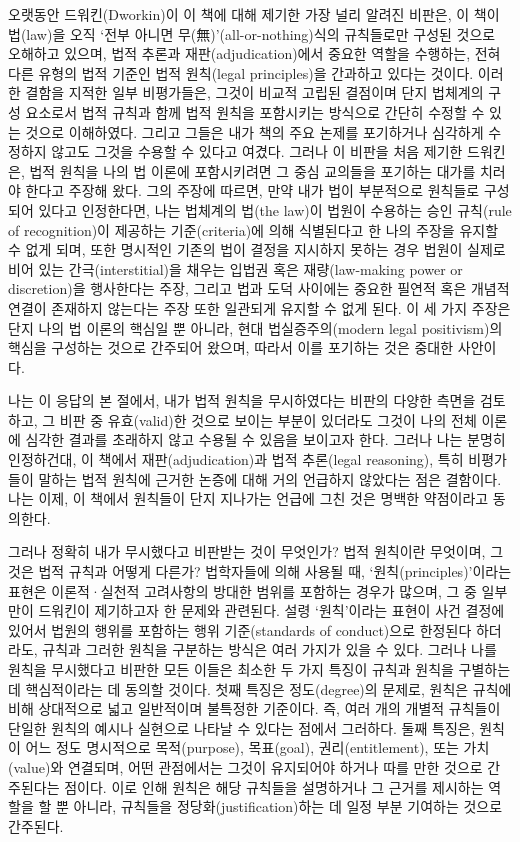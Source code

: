 오랫동안 드워킨(Dworkin)이 이 책에 대해 제기한 가장 널리 알려진 비판은,
이 책이 법(law)을 오직 `전부 아니면 무(無)'(all-or-nothing)식의
규칙들로만 구성된 것으로 오해하고 있으며, 법적 추론과
재판(adjudication)에서 중요한 역할을 수행하는, 전혀 다른 유형의 법적
기준인 법적 원칙(legal principles)을 간과하고 있다는 것이다. 이러한
결함을 지적한 일부 비평가들은, 그것이 비교적 고립된 결점이며 단지
법체계의 구성 요소로서 법적 규칙과 함께 법적 원칙을 포함시키는 방식으로
간단히 수정할 수 있는 것으로 이해하였다. 그리고 그들은 내가 책의 주요
논제를 포기하거나 심각하게 수정하지 않고도 그것을 수용할 수 있다고
여겼다. 그러나 이 비판을 처음 제기한 드워킨은, 법적 원칙을 나의 법
이론에 포함시키려면 그 중심 교의들을 포기하는 대가를 치러야 한다고
주장해 왔다. 그의 주장에 따르면, 만약 내가 법이 부분적으로 원칙들로
구성되어 있다고 인정한다면, 나는 법체계의 법(the law)이 법원이 수용하는
승인 규칙(rule of recognition)이 제공하는 기준(criteria)에 의해
식별된다고 한 나의 주장을 유지할 수 없게 되며, 또한 명시적인 기존의 법이
결정을 지시하지 못하는 경우 법원이 실제로 비어 있는 간극(interstitial)을
채우는 입법권 혹은 재량(law-making power or discretion)을 행사한다는
주장, 그리고 법과 도덕 사이에는 중요한 필연적 혹은 개념적 연결이
존재하지 않는다는 주장 또한 일관되게 유지할 수 없게 된다. 이 세 가지
주장은 단지 나의 법 이론의 핵심일 뿐 아니라, 현대 법실증주의(modern
legal positivism)의 핵심을 구성하는 것으로 간주되어 왔으며, 따라서 이를
포기하는 것은 중대한 사안이다.

나는 이 응답의 본 절에서, 내가 법적 원칙을 무시하였다는 비판의 다양한
측면을 검토하고, 그 비판 중 유효(valid)한 것으로 보이는 부분이 있더라도
그것이 나의 전체 이론에 심각한 결과를 초래하지 않고 수용될 수 있음을
보이고자 한다. 그러나 나는 분명히 인정하건대, 이 책에서
재판(adjudication)과 법적 추론(legal reasoning), 특히 비평가들이 말하는
법적 원칙에 근거한 논증에 대해 거의 언급하지 않았다는 점은 결함이다.
나는 이제, 이 책에서 원칙들이 단지 지나가는 언급에 그친 것은 명백한
약점이라고 동의한다.

그러나 정확히 내가 무시했다고 비판받는 것이 무엇인가? 법적 원칙이란
무엇이며, 그것은 법적 규칙과 어떻게 다른가? 법학자들에 의해 사용될 때,
`원칙(principles)'이라는 표현은 이론적·실천적 고려사항의 방대한 범위를
포함하는 경우가 많으며, 그 중 일부만이 드워킨이 제기하고자 한 문제와
관련된다. 설령 `원칙'이라는 표현이 사건 결정에 있어서 법원의 행위를
포함하는 행위 기준(standards of conduct)으로 한정된다 하더라도, 규칙과
그러한 원칙을 구분하는 방식은 여러 가지가 있을 수 있다. 그러나 나를
원칙을 무시했다고 비판한 모든 이들은 최소한 두 가지 특징이 규칙과 원칙을
구별하는 데 핵심적이라는 데 동의할 것이다. 첫째 특징은 정도(degree)의
문제로, 원칙은 규칙에 비해 상대적으로 넓고 일반적이며 불특정한 기준이다.
즉, 여러 개의 개별적 규칙들이 단일한 원칙의 예시나 실현으로 나타날 수
있다는 점에서 그러하다. 둘째 특징은, 원칙이 어느 정도 명시적으로
목적(purpose), 목표(goal), 권리(entitlement), 또는 가치(value)와
연결되며, 어떤 관점에서는 그것이 유지되어야 하거나 따를 만한 것으로
간주된다는 점이다. 이로 인해 원칙은 해당 규칙들을 설명하거나 그 근거를
제시하는 역할을 할 뿐 아니라, 규칙들을 정당화(justification)하는 데 일정
부분 기여하는 것으로 간주된다.


